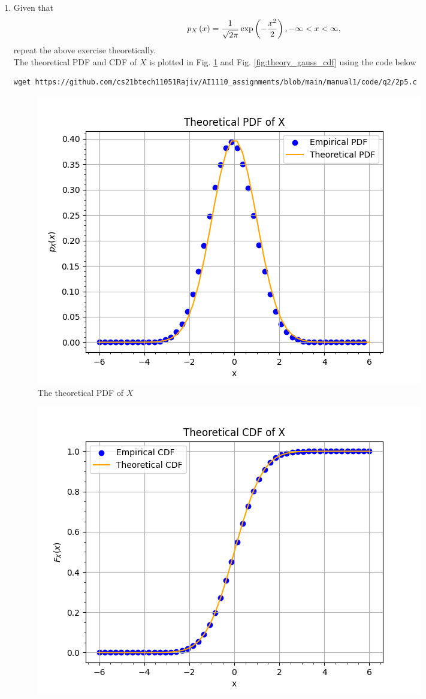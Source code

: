 \documentclass[journal,12pt,twocolumn]{IEEEtran}
\renewcommand\thesection{\arabic{section}}
\begin{document}
\begin{enumerate}[label=\thesection.\arabic*
,ref=\thesection.\theenumi]
\begin{align}
\mean{X}  = 0.000294 \\
\var{X}  = 0.999560
\end{align}
%
\item Given that 
\begin{align}
p_{X}\left(x\right) = \frac{1}{\sqrt{2\pi}}\exp\left(-\frac{x^2}{2}\right), -\infty < x < \infty,
\end{align}
repeat the above exercise theoretically.
\\
\solution The theoretical PDF and CDF of $X$ is plotted in Fig. \ref{fig:theory_gauss_pdf} and Fig.  \ref{fig:theory_gauss_cdf}  using the code below
\begin{lstlisting}
wget https://github.com/cs21btech11051Rajiv/AI1110_assignments/blob/main/manual1/code/q2/2p5.c
\end{lstlisting}
\begin{figure}[ht!]
    \centering
    \includegraphics[width=\columnwidth]{./figs/fig2.5.png}
    \caption{The theoretical PDF of $X$}
    \label{fig:theory_gauss_pdf}
\end{figure}
\begin{figure}[ht!]
    \centering
    \includegraphics[width=\columnwidth]{./figs/fig2.5b.png}

\end{figure}
\end{enumerate}
\end{document}
